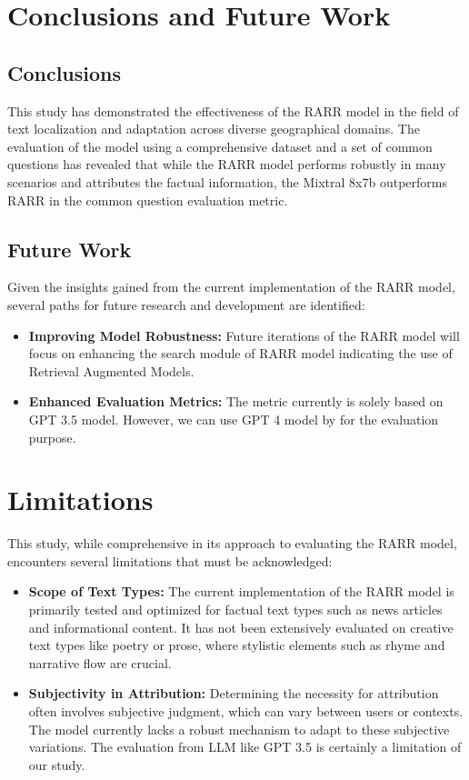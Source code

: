 \documentclass[11pt]{article}
\begin{document}
	\section{Conclusions and Future Work}
	\subsection{Conclusions}
	This study has demonstrated the effectiveness of the RARR model in the field of text localization and adaptation across diverse geographical domains. The evaluation of the model using a comprehensive dataset and a set of common questions has revealed that while the RARR model performs robustly in many scenarios and attributes the factual information, the Mixtral 8x7b outperforms RARR in the common question evaluation metric.
	
	\subsection{Future Work}
	Given the insights gained from the current implementation of the RARR model, several paths for future research and development are identified:
	
	\begin{itemize}
		\item \textbf{Improving Model Robustness:} Future iterations of the RARR model will focus on enhancing the search module of RARR model indicating the use of Retrieval Augmented Models.
		
		\item \textbf{Enhanced Evaluation Metrics:} The metric currently is solely based on GPT 3.5 model. However, we can use GPT 4 model by \cite{openai2024gpt4} for the evaluation purpose.
	\end{itemize}
	
	\section*{Limitations}
	This study, while comprehensive in its approach to evaluating the RARR model, encounters several limitations that must be acknowledged:
	
	\begin{itemize}
		\item \textbf{Scope of Text Types:} The current implementation of the RARR model is primarily tested and optimized for factual text types such as news articles and informational content. It has not been extensively evaluated on creative text types like poetry or prose, where stylistic elements such as rhyme and narrative flow are crucial.
		
		\item \textbf{Subjectivity in Attribution:} Determining the necessity for attribution often involves subjective judgment, which can vary between users or contexts. The model currently lacks a robust mechanism to adapt to these subjective variations. The evaluation from LLM like GPT 3.5 is certainly a limitation of our study.
	\end{itemize}
	
\end{document}
